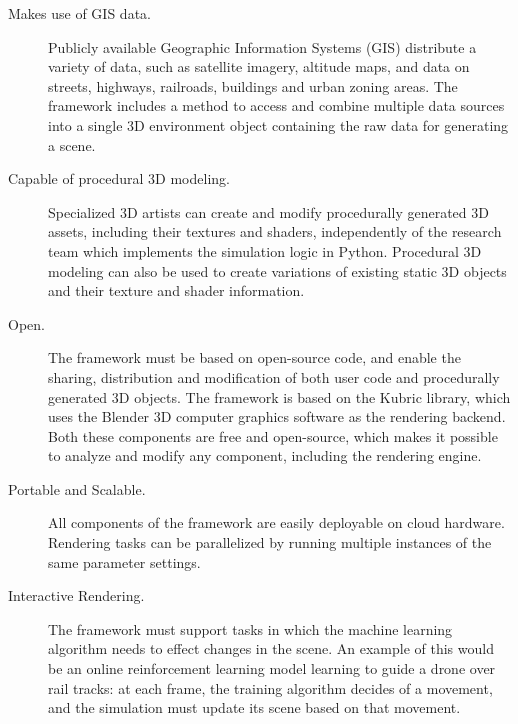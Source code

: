 \begin{description}
    \item[Makes use of GIS data.] Publicly available Geographic Information Systems (GIS) distribute a variety of data, such as satellite imagery, altitude maps, and data on streets, highways, railroads, buildings and urban zoning areas. The framework includes a method to access and combine multiple data sources into a single 3D environment object containing the raw data for generating a scene.
    \item[Capable of procedural 3D modeling.] Specialized 3D artists can create and modify procedurally generated 3D assets, including their textures and shaders, independently of the research team which implements the simulation logic in Python. Procedural 3D modeling can also be used to create variations of existing static 3D objects and their texture and shader information.
    \item[Open.]  The framework must be based on open-source code, and enable the sharing, distribution and modification of both user code and procedurally generated 3D objects. The framework is based on the Kubric library, which uses the Blender 3D computer graphics software as  the rendering backend. Both these components are free and open-source, which makes it possible to analyze and modify any component, including the rendering engine.
    \item[Portable and Scalable.]  All components of the framework are easily deployable on cloud hardware. Rendering tasks can be parallelized by running multiple instances of the same parameter settings.
    \item[Interactive Rendering.] The framework must support tasks in which the machine learning algorithm needs to effect changes in the scene. An example of this would be an online reinforcement learning model learning to guide a drone over rail tracks: at each frame, the training algorithm decides of a movement, and the simulation must update its scene based on that movement.
\end{description}


